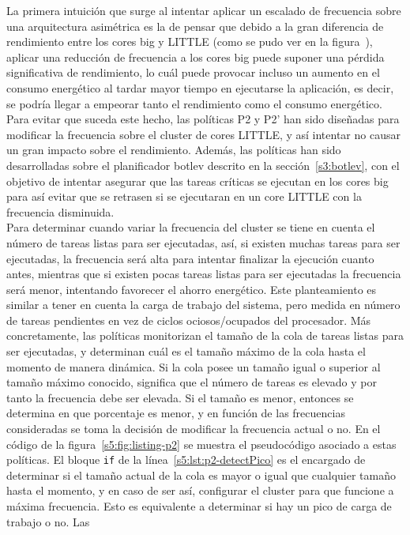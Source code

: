 La primera intuición que surge al intentar aplicar un escalado de
frecuencia sobre una arquitectura asimétrica es la de pensar que debido a
la gran diferencia de rendimiento entre los cores big y LITTLE (como se
pudo ver en la figura~), aplicar una reducción de frecuencia a
los cores big puede suponer una pérdida significativa de rendimiento, lo
cuál puede provocar incluso un aumento en el consumo energético al tardar
mayor tiempo en ejecutarse la aplicación, es decir, se podría llegar a
empeorar tanto el rendimiento como el consumo energético. Para evitar que
suceda este hecho, las políticas P2 y P2' han sido diseñadas para modificar
la frecuencia sobre el cluster de cores LITTLE, y así intentar no causar un
gran impacto sobre el rendimiento. Además, las políticas han sido
desarrolladas sobre el planificador botlev descrito en la
sección~\ref{s3:botlev}, con el objetivo de intentar asegurar que las
tareas críticas se ejecutan en los cores big para así evitar que se
retrasen si se ejecutaran en un core LITTLE con la frecuencia disminuida.\\
Para determinar cuando variar la frecuencia del cluster se tiene en cuenta
el número de tareas listas para ser ejecutadas, así, si existen muchas
tareas para ser ejecutadas, la frecuencia será alta para intentar finalizar
la ejecución cuanto antes, mientras que si existen pocas tareas listas para
ser ejecutadas la frecuencia será menor, intentando favorecer el ahorro
energético. Este planteamiento es similar a tener en cuenta la carga de
trabajo del sistema, pero medida en número de tareas pendientes en vez de
ciclos ociosos/ocupados del procesador. Más concretamente, las políticas
monitorizan el tamaño de la cola de tareas listas para ser ejecutadas, y
determinan cuál es el tamaño máximo de la cola hasta el momento de manera
dinámica. Si la cola posee un tamaño igual o superior al tamaño máximo
conocido, significa que el número de tareas es elevado y por tanto la
frecuencia debe ser elevada. Si el tamaño es menor, entonces se determina
en que porcentaje es menor, y en función de las frecuencias consideradas se
toma la decisión de modificar la frecuencia actual o no. En el código de la
figura~\ref{s5:fig:listing-p2} se muestra el pseudocódigo asociado a estas
políticas. El bloque \texttt{if} de la línea~\ref{s5:lst:p2-detectPico} es
el encargado de determinar si el tamaño actual de la cola es mayor o igual
que cualquier tamaño hasta el momento, y en caso de ser así, configurar el
cluster para que funcione a máxima frecuencia. Esto es equivalente a
determinar si hay un pico de carga de trabajo o no. Las
